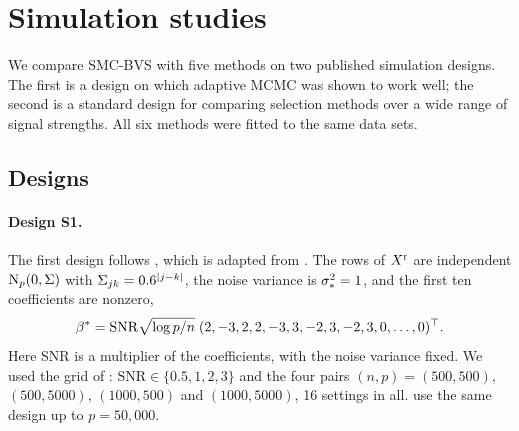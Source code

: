 
\section{Simulation studies}\label{sec:sims}

We compare SMC-BVS with five methods on two published simulation designs. The first is a design on which adaptive
MCMC was shown to work well; the second is a standard design for comparing selection methods over a wide range of
signal strengths. All six methods were fitted to the same data sets.

\subsection{Designs}\label{sec:sims-designs}

\paragraph{Design S1.} The first design follows \citet[Sec.~4.1 and Table~1]{GriffinLatuszynskiSteel2021}, which is
adapted from \citet[Sec.~3.4.1]{YangWainwrightJordan2016}. The rows of $X^{\mathrm r}$ are independent $\mathrm{N}_p(0,\Sigma)$
with $\Sigma_{jk}=0.6^{\lvert j-k\rvert}$, the noise variance is $\sigma_*^2=1$, and the first ten coefficients are nonzero,
\begin{equation}\label{eq:s1beta}
  \beta^*=\mathrm{SNR}\sqrt{\log p/n}\;(2,-3,2,2,-3,3,-2,3,-2,3,0,\dots,0)^\top .
\end{equation}
Here SNR is a multiplier of the coefficients, with the noise variance fixed. We used the grid of
\citet[Table~1]{GriffinLatuszynskiSteel2021}: $\mathrm{SNR}\in\{0.5,1,2,3\}$ and the four pairs
$(n,p)=(500,500)$, $(500,5000)$, $(1000,500)$ and $(1000,5000)$, 16 settings in all.
\citet{LiangLivingstoneGriffin2022} use the same design up to $p=50{,}000$.

